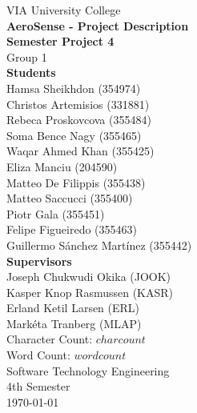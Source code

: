 \thispagestyle{empty}
\vspace*{0.15\textheight}
\begin{center}
    {\Large VIA University College}\\[2em]
    {\huge \textbf{AeroSense - Project Description}}\\[0.5em]
    {\Large \textbf{Semester Project 4}}\\[0.5em]
    {\Large Group 1}\\[3em]
    {\large \textbf{Students}}\\[0.5em]
    {\large Hamsa Sheikhdon (354974)}\\[0.5em]
    {\large Christos Artemisios (331881)}\\[0.5em]
    {\large Rebeca Proskovcova (355484)}\\[0.5em]
    {\large Soma Bence Nagy (355465)}\\[0.5em]
    {\large Waqar Ahmed Khan (355425)}\\[0.5em]
    {\large Eliza Manciu (204590)}\\[0.5em]
    {\large Matteo De Filippis (355438)}\\[0.5em]
    {\large Matteo Saccucci (355400)}\\[0.5em]
    {\large Piotr Gala (355451)}\\[0.5em]
    {\large Felipe Figueiredo (355463)}\\[0.5em]
    {\large Guillermo Sánchez Martínez (355442)}\\[2em]
    {\large \textbf{Supervisors}}\\[0.5em]
    {\large Joseph Chukwudi Okika (JOOK)}\\[0.5em]
    {\large Kasper Knop Rasmussen (KASR)}\\[0.5em]
    {\large Erland Ketil Larsen (ERL)}\\[0.5em]
    {\large Markéta Tranberg (MLAP)}\\[2em]
    {\large Character Count: $charcount$}\\[0.5em]
    {\large Word Count: $wordcount$}\\[2em]
    {\Large Software Technology Engineering}\\[1em]
    {\Large 4th Semester}\\[1em]
    {\large \today}\\[1em]
\end{center}
\vfill
\clearpage